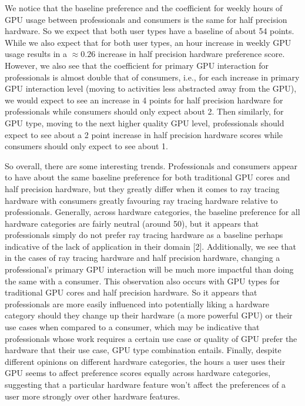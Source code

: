 \documentclass[
]{article}
\begin{document}
We notice that the baseline preference and the coefficient for weekly
hours of GPU usage between professionals and consumers is the same for
half precision hardware. So we expect that both user types have a
baseline of about 54 points. While we also expect that for both user
types, an hour increase in weekly GPU usage results in a
\(\approx 0.26\) increase in half precision hardware preference score.
However, we also see that the coefficient for primary GPU interaction
for professionals is almost double that of consumers, i.e., for each
increase in primary GPU interaction level (moving to activities less
abstracted away from the GPU), we would expect to see an increase in 4
points for half precision hardware for professionals while consumers
should only expect about 2. Then similarly, for GPU type, moving to the
next higher quality GPU level, professionals should expect to see about
a 2 point increase in half precision hardware scores while consumers
should only expect to see about 1.

So overall, there are some interesting trends. Professionals and
consumers appear to have about the same baseline preference for both
traditional GPU cores and half precision hardware, but they greatly
differ when it comes to ray tracing hardware with consumers greatly
favouring ray tracing hardware relative to professionals. Generally,
across hardware categories, the baseline preference for all hardware
categories are fairly neutral (around 50), but it appears that
professionals simply do not prefer ray tracing hardware as a baseline
perhaps indicative of the lack of application in their domain {[}2{]}.
Additionally, we see that in the cases of ray tracing hardware and half
precision hardware, changing a professional's primary GPU interaction
will be much more impactful than doing the same with a consumer. This
observation also occurs with GPU types for traditional GPU cores and
half precision hardware. So it appears that professionals are more
easily influenced into potentially liking a hardware category should
they change up their hardware (a more powerful GPU) or their use cases
when compared to a consumer, which may be indicative that professionals
whose work requires a certain use case or quality of GPU prefer the
hardware that their use case, GPU type combination entails. Finally,
despite different opinions on different hardware categories, the hours a
user uses their GPU seems to affect preference scores equally across
hardware categories, suggesting that a particular hardware feature won't
affect the preferences of a user more strongly over other hardware
features.
\end{document}
